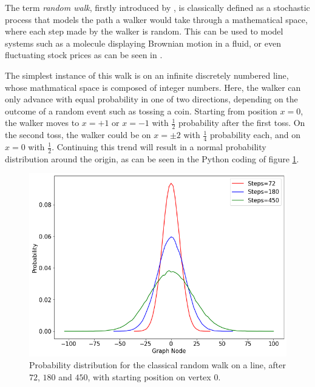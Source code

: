 \documentclass[../../dissertation.tex]{subfiles}
\begin{document}
The term \textit{random walk}, firstly introduced by \cite{kpearson1905}, is
classically defined as a stochastic process that models the path a walker would
take through a mathematical space, where each step made by the walker is
random. This can be used to model systems such as a molecule displaying
Brownian motion in a fluid, or even fluctuating stock prices as can be seen in
\cite{sottinen2001}.\par The simplest instance of this walk is on an infinite
discretely numbered line, whose mathmatical space is composed of integer
numbers. Here, the walker can only advance with equal probability in one of two
directions, depending on the outcome of a random event such as tossing a coin.
Starting from position $x=0$, the walker moves to $x = +1$ or $ x = -1$ with
$\frac{1}{2}$ probability after the first toss. On the second toss, the walker
could be on $x =\pm 2$ with $\frac{1}{4}$ probability each, and on $x = 0$ with
$\frac{1}{2}$.  Continuing this trend will result in a normal probability
distribution around the origin, as can be seen in the Python coding of figure
\ref{fig:MultClassicalWalk72180450}.
\begin{figure}[!h]
	\centering
	\includegraphics[scale=0.40]{img/ClassicalWalk/MultClassicalWalk72180450}
	\caption{Probability distribution for the classical random walk on a line, after $72$, $180$ and $450$, with starting position on vertex $0$.} 
	\label{fig:MultClassicalWalk72180450}
\end{figure}\par
\end{document}
